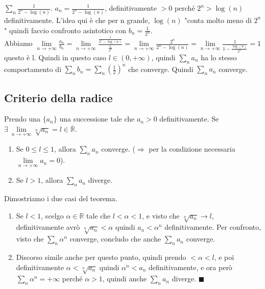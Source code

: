 \begin{example}
$\sum_n \frac{1}{2^n - \log(n)}$. $a_n = \frac{1}{2^n - \log(n)}$, definitivamente $> 0$ perché $2^n > \log(n)$ definitivamente. L'idea qui è che per n grande, $\log(n)$ "conta molto meno di $2^n$" quindi faccio confronto asintotico con $b_n = \frac{1}{2^n}$.\\
Abbiamo $\lim\limits_{n\to +\infty}\frac{a_n}{b_n} = \lim\limits_{n\to +\infty} \frac{\frac{1}{2^n - \log(n)}}{\frac{1}{2^n}} = \lim\limits_{n\to +\infty}\frac{2^n}{2^n - \log(n)} = \lim\limits_{n\to +\infty} \frac{1}{1 - \frac{\log(n)}{2^n}} = 1$ questo è l. Quindi in questo caso $l \in (0, +\infty)$, quindi $\sum_n a_n$ ha lo stesso comportamento di $\sum_n b_n = \sum_n (\frac{1}{2})^n$ che converge. Quindi $\sum_n a_n$ converge.
\end{example}

\subsection{Criterio della radice}
\begin{theorem}
Prendo una $\{a_n\}$ una successione tale che $a_n > 0$ definitivamente. Se $\exists \: \lim\limits_{n \to +\infty}\sqrt[n]{a_n} = l \in \overline{\mathbb{R}}$.
\begin{enumerate}
    \item Se $0 \leq l \leq 1$, allora $\sum_n a_n$ converge. ($\Longrightarrow$ per la condizione necessaria $\lim\limits_{n\to +\infty}a_n = 0$).
    \item Se $l > 1$, allora $\sum_n a_n$ diverge.
\end{enumerate}
\end{theorem}

\begin{demostration}
Dimostriamo i due casi del teorema.
\begin{enumerate}
    \item Se $l < 1$, scelgo $\alpha \in \mathbb{R}$ tale che $l < \alpha < 1$, e visto che $\sqrt[n]{a_n}\to l$, definitivamente avrò $\sqrt[n]{a_n} < \alpha$ quindi $a_n < \alpha^n$ definitivamente. Per confronto, visto che $\sum_n \alpha^n$ converge, concludo che anche $\sum_n a_n$ converge.
    \item Discorso simile anche per questo punto, quindi prendo $< \alpha < l$, e poi definitivamente $\alpha < \sqrt[n]{a_n}$ quindi $\alpha^n < a_n$ definitivamente, e ora però $\sum_n \alpha^n = +\infty$ perché $\alpha > 1$, quindi anche $\sum_n a_n$ diverge. $\blacksquare$
\end{enumerate}
\end{demostration}


